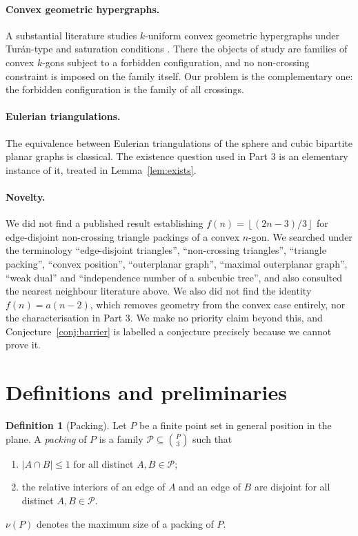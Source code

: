 \documentclass[11pt]{article}
\theoremstyle{plain}
\theoremstyle{definition}
\newtheorem{definition}[theorem]{Definition}
\theoremstyle{remark}
\newcommand{\Floor}[1]{\left\lfloor #1\right\rfloor}
\newcommand{\pack}{\mathcal{P}}
\begin{document}
\paragraph{Convex geometric hypergraphs.}
A substantial literature studies $k$-uniform convex geometric hypergraphs under Tur\'an-type
and saturation conditions \cite{furedijiangkostochka2020,oneillspiro2021}.  There the
objects of study are families of convex $k$-gons subject to a forbidden configuration, and
no non-crossing constraint is imposed on the family itself.  Our problem is the
complementary one: the forbidden configuration is the family of all crossings.

\paragraph{Eulerian triangulations.}
The equivalence between Eulerian triangulations of the sphere and cubic bipartite planar
graphs is classical.  The existence question used in Part 3 is an elementary instance of
it, treated in Lemma~\ref{lem:exists}.

\paragraph{Novelty.}
We did not find a published result establishing $f(n)=\Floor{(2n-3)/3}$ for edge-disjoint
non-crossing triangle packings of a convex $n$-gon.  We searched under the terminology
``edge-disjoint triangles'', ``non-crossing triangles'', ``triangle packing'', ``convex
position'', ``outerplanar graph'', ``maximal outerplanar graph'', ``weak dual'' and
``independence number of a subcubic tree'', and also consulted the nearest neighbour
literature above.  We also did not find the identity $f(n)=a(n-2)$, which removes geometry
from the convex case entirely, nor the characterisation in Part 3.  We make no priority
claim beyond this, and Conjecture~\ref{conj:barrier} is labelled a conjecture precisely
because we cannot prove it.

\section{Definitions and preliminaries}

\begin{definition}[Packing]\label{def:packing}
Let $P$ be a finite point set in general position in the plane.  A \emph{packing} of $P$
is a family $\pack\subseteq\binom{P}{3}$ such that
\begin{enumerate}[label=(\roman*)]
\item $|A\cap B|\le 1$ for all distinct $A,B\in\pack$;
\item the relative interiors of an edge of $A$ and an edge of $B$ are disjoint for all
      distinct $A,B\in\pack$.
\end{enumerate}
$\nu(P)$ denotes the maximum size of a packing of $P$.
\end{definition}
\end{document}
